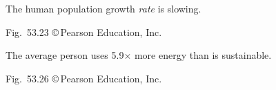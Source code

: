\documentclass[t]{beamer}
\begin{document}
{
\begin{frame}[b]{The human population growth \emph{rate} is slowing.}

	\hfill \tiny Fig.~53.23 \copyright\,Pearson Education, Inc.
\end{frame}
}
%
%
%	
%	
%	
%
%
%	
%
%	
%	
%	
%	
%
%
%
%


{
\begin{frame}[b]{The average person uses 5.9$\times$ more energy than is sustainable.}

	\hfill \tiny Fig.~53.26 \copyright\,Pearson Education, Inc.
\end{frame}
}
\end{document}
